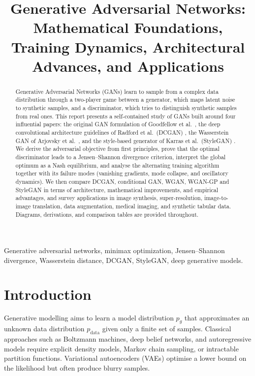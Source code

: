 \documentclass[conference]{IEEEtran}
\newcommand{\pdata}{p_{\mathrm{data}}}
\newcommand{\pg}{p_{g}}
\theoremstyle{plain}
\theoremstyle{definition}
\begin{document}
\title{Generative Adversarial Networks: Mathematical Foundations, Training Dynamics, Architectural Advances, and Applications}


\maketitle

\begin{abstract}
Generative Adversarial Networks (GANs) learn to sample from a complex data distribution through a two-player game between a generator, which maps latent noise to synthetic samples, and a discriminator, which tries to distinguish synthetic samples from real ones. This report presents a self-contained study of GANs built around four influential papers: the original GAN formulation of Goodfellow et al.\ \cite{goodfellow2014gan}, the deep convolutional architecture guidelines of Radford et al.\ (DCGAN) \cite{radford2016dcgan}, the Wasserstein GAN of Arjovsky et al.\ \cite{arjovsky2017wgan}, and the style-based generator of Karras et al.\ (StyleGAN) \cite{karras2019stylegan}. We derive the adversarial objective from first principles, prove that the optimal discriminator leads to a Jensen--Shannon divergence criterion, interpret the global optimum as a Nash equilibrium, and analyse the alternating training algorithm together with its failure modes (vanishing gradients, mode collapse, and oscillatory dynamics). We then compare DCGAN, conditional GAN, WGAN, WGAN-GP and StyleGAN in terms of architecture, mathematical improvements, and empirical advantages, and survey applications in image synthesis, super-resolution, image-to-image translation, data augmentation, medical imaging, and synthetic tabular data. Diagrams, derivations, and comparison tables are provided throughout.
\end{abstract}

\begin{IEEEkeywords}
Generative adversarial networks, minimax optimization, Jensen--Shannon divergence, Wasserstein distance, DCGAN, StyleGAN, deep generative models.
\end{IEEEkeywords}

\section{Introduction}
Generative modelling aims to learn a model distribution $\pg$ that approximates an unknown data distribution $\pdata$ given only a finite set of samples. Classical approaches such as Boltzmann machines, deep belief networks, and autoregressive models require explicit density models, Markov chain sampling, or intractable partition functions. Variational autoencoders (VAEs) \cite{kingma2014vae} optimise a lower bound on the likelihood but often produce blurry samples.
\end{document}
